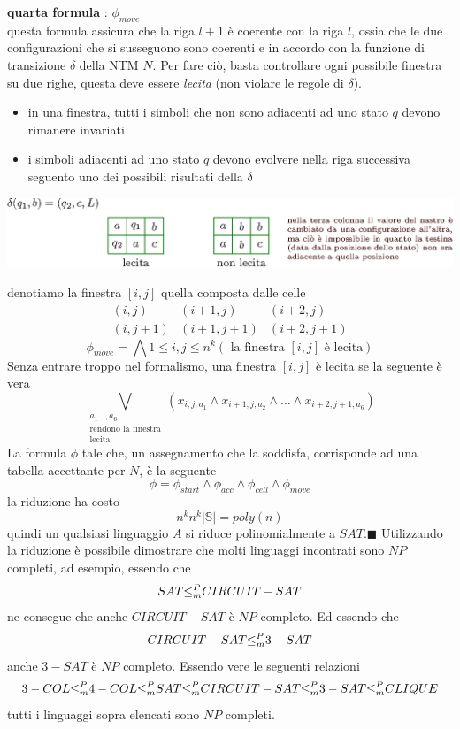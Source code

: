 \documentclass[10pt, letterpaper]{report}
\begin{document}
\textbf{quarta formula} : $\phi_{move}$\\
questa formula assicura che la riga $l+1$ è coerente con la riga $l$, ossia che le due configurazioni che si susseguono sono coerenti e in accordo con la funzione di transizione $\delta$ della NTM $N$. Per fare ciò, basta controllare ogni possibile finestra su due righe, questa deve essere \textit{lecita} (non violare le regole di $\delta$).\begin{itemize}
    \item in una finestra, tutti i simboli che non sono adiacenti ad uno stato $q$ devono rimanere invariati 
    \item i simboli adiacenti ad uno stato $q$ devono evolvere nella riga successiva seguento uno dei possibili risultati della $\delta$
\end{itemize}\begin{center}
    \includegraphics[width=\textwidth ]{images/finestraLecita.eps}
\end{center}
denotiamo la finestra $[i,j]$ quella composta dalle celle$$ \begin{matrix}
    (i,j) & (i+1,j) & (i+2,j)\\ 
    (i,j+1) & (i+1,j+1) & (i+2,j+1)
\end{matrix}$$
$$ \phi_{move}=\bigwedge\limits{1 \leq i,j \leq n^k}
(\text{ la finestra $[i,j]$ è lecita})$$
Senza entrare troppo nel formalismo, una finestra $[i,j]$ è lecita se la seguente è vera 
$$ \bigvee_{\begin{matrix}
a_1\dots,a_6\\ 
\text{rendono la finestra}\\\text{lecita}
\end{matrix}}
(x_{i,j,a_1}\land x_{i+1,j,a_2}\land \dots \land x_{i+2,j+1,a_6})
$$
La formula $\phi$ tale che, un assegnamento che la soddisfa, corrisponde ad una tabella accettante per $N$, è la seguente 
$$ \phi = \phi_{start}\land \phi_{acc}\land \phi_{cell}\land \phi_{move}$$
la riduzione ha costo $$ n^kn^k|\mathbb S|=poly(n)$$
quindi un qualsiasi linguaggio $A$ si riduce polinomialmente a $SAT$.\hfill$\blacksquare$\acc   
Utilizzando la riduzione è possibile dimostrare che molti linguaggi incontrati sono $NP$ completi, ad esempio, essendo che $$ SAT{\le_m^P} CIRCUIT-SAT$$
ne consegue che anche $CIRCUIT-SAT$ è $NP$ completo. Ed essendo che 
$$CIRCUIT-SAT{\le_m^P} 3-SAT$$
anche $3-SAT$ è $NP$ completo. Essendo vere le seguenti relazioni 
$$ 
3-COL {\le_m^P} 4-COL {\le_m^P} SAT {\le_m^P} CIRCUIT-SAT {\le_m^P} 3-SAT {\le_m^P} CLIQUE
$$
tutti i linguaggi sopra elencati sono $NP$ completi.
\end{document}
